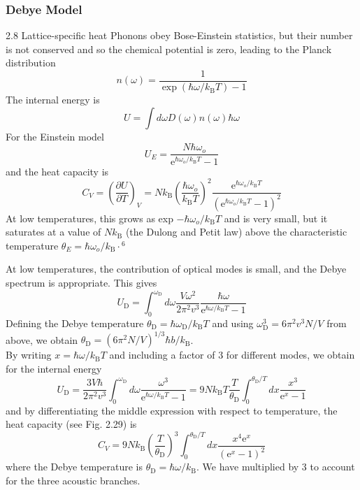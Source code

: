 \documentclass[12pt,a4paper]{article}
\begin{document}
    \subsubsection{Debye Model}
    2.8 Lattice-specific heat
    Phonons obey Bose-Einstein statistics, but their number is not conserved and so the chemical potential is zero, leading to the Planck distribution
    $$
    n(\omega)=\frac{1}{\exp \left(\hbar \omega / k_{\mathrm{B}} T\right)-1}
    $$
    The internal energy is
    $$
    U=\int d \omega D(\omega) n(\omega) \hbar \omega
    $$
    For the Einstein model
    $$
    U_E=\frac{N \hbar \omega_o}{\mathrm{e}^{\hbar \omega_o / k_{\mathrm{B}} T}-1}
    $$
    and the heat capacity is
    $$
    C_V=\left(\frac{\partial U}{\partial T}\right)_V=N k_{\mathrm{B}}\left(\frac{\hbar \omega_o}{k_{\mathrm{B}} T}\right)^2 \frac{\mathrm{e}^{\hbar \omega_o / k_{\mathrm{B}} T}}{\left(\mathrm{e}^{\hbar \omega_o / k_{\mathrm{B}} T}-1\right)^2}
    $$
    At low temperatures, this grows as exp $-\hbar \omega_o / k_{\mathrm{B}} T$ and is very small, but it saturates at a value of $N k_{\mathrm{B}}$ (the Dulong and Petit law) above the characteristic temperature $\theta_E=\hbar \omega_o / k_{\mathrm{B}} \cdot{ }^6$

    At low temperatures, the contribution of optical modes is small, and the Debye spectrum is appropriate. This gives
    $$
    U_{\mathrm{D}}=\int_0^{\omega_{\mathrm{D}}} d \omega \frac{V \omega^2}{2 \pi^2 v^3} \frac{\hbar \omega}{\mathrm{e}^{\hbar \omega / k_{\mathrm{B}} T}-1}
    $$
    Defining the Debye temperature $\theta_{\mathrm{D}}=\hbar \omega_{\mathrm{D}} / k_{\mathrm{B}} T$ and using $\omega_{\mathrm{D}}^3=6 \pi^2 v^3 N / V$ from above, we obtain $\theta_{\mathrm{D}}=\left(6 \pi^2 N / V\right)^{1 / 3} \hbar b / k_{\mathrm{B}}$. \\
    By writing $x=\hbar \omega / k_{\mathrm{B}} T$ and including a factor of 3 for different modes, we obtain for the internal energy
    $$
    U_{\mathrm{D}}=\frac{3 V \hbar}{2 \pi^2 v^3} \int_0^{\omega_{\mathrm{D}}} d \omega \frac{\omega^3}{\mathrm{e}^{\hbar \omega / k_{\mathrm{B}} T}-1}=9 N k_{\mathrm{B}} T \frac{T}{\theta_{\mathrm{D}}} \int_0^{\theta_{\mathrm{D}} / T} d x \frac{x^3}{\mathrm{e}^x-1}
    $$
    and by differentiating the middle expression with respect to temperature, the heat capacity (see Fig. 2.29) is
    $$
    C_V=9 N k_{\mathrm{B}}\left(\frac{T}{\theta_{\mathrm{D}}}\right)^3 \int_0^{\theta_{\mathrm{D}} / T} d x \frac{x^4 \mathrm{e}^x}{\left(\mathrm{e}^x-1\right)^2}
    $$
    where the Debye temperature is $\theta_{\mathrm{D}}=\hbar \omega / k_{\mathrm{B}}$. We have multiplied by 3 to account for the three acoustic branches.
\end{document}
